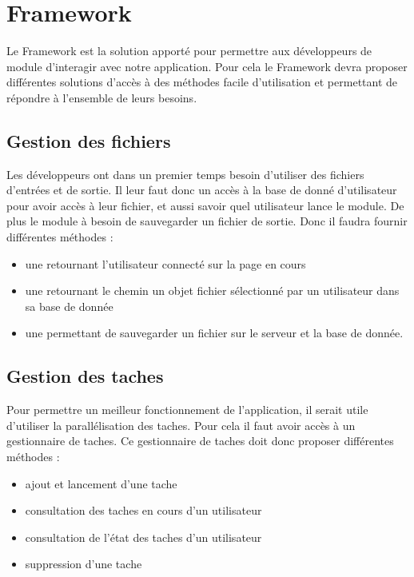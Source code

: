 \section{Framework}

Le Framework est la solution apporté pour permettre aux développeurs de module d'interagir avec notre application. Pour cela le Framework devra proposer différentes solutions d'accès à des méthodes facile d'utilisation et permettant de répondre à l'ensemble de leurs besoins. \\


\subsection{Gestion des fichiers}

Les développeurs ont dans un premier temps besoin d'utiliser des fichiers d'entrées et de sortie. Il leur faut donc un accès à la base de donné d'utilisateur pour avoir accès à leur fichier, et aussi savoir quel utilisateur lance le module. De plus le module à besoin de sauvegarder un fichier de sortie. Donc il faudra fournir différentes méthodes :\\
\begin{itemize}
\item une retournant l'utilisateur connecté sur la page en cours
\item une retournant le chemin un objet fichier sélectionné par un utilisateur dans sa base de donnée
\item une permettant de sauvegarder un fichier sur le serveur et la base de donnée.
\end{itemize}

\subsection{Gestion des taches}

Pour permettre un meilleur fonctionnement de l'application, il serait utile d'utiliser la parallélisation des taches. Pour cela il faut avoir accès à un gestionnaire de taches. Ce gestionnaire de taches doit donc proposer différentes méthodes : \\
\begin{itemize}
\item ajout et lancement d'une tache
\item consultation des taches en cours d'un utilisateur
\item consultation de l'état des taches d'un utilisateur
\item suppression d'une tache
\end{itemize}
